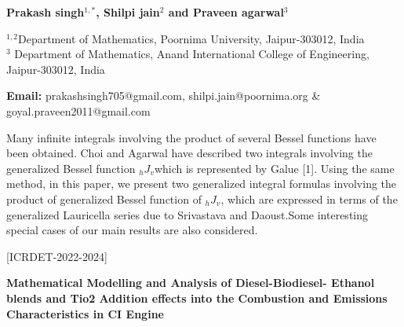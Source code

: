 \documentclass[twoside,11pt]{amsart}
\begin{document}
\centerline{\textbf{Prakash singh$^{1,*}$,  Shilpi jain$^{2}$ and Praveen agarwal$^{3}$   }}
\vskip 5mm
\begin{flushleft}
$^{1,2}$Department of Mathematics, Poornima University, Jaipur-303012, India\\
$^{3}$ Department of Mathematics, Anand International College of Engineering,
Jaipur-303012, India
\vskip 5mm
\end{flushleft}
\vskip 2mm
\begin{flushleft}
{\bf Email:}  prakashsingh705@gmail.com, shilpi.jain@poornima.org \&   goyal.praveen2011@gmail.com
\end{flushleft}
\vskip 5mm
Many infinite integrals involving the product of several Bessel functions
have been obtained. Choi and Agarwal have described two integrals involving the generalized Bessel function ${}_hJ_v$which is represented by Galue [1]. Using the same method,
in this paper, we present two generalized integral formulas involving the product of
generalized Bessel function of  ${}_hJ_v$, which are expressed in terms of the generalized
Lauricella series due to Srivastava and Daoust.Some interesting special cases of our
main results are also considered.
\newpage















\vskip 5mm
\begin{flushleft}
\centerline{[ICRDET-2022-2024]}
\end{flushleft}
\begin{center}\bf\LARGE
Mathematical Modelling and Analysis of Diesel-Biodiesel-
Ethanol blends and Tio2 Addition effects into the Combustion
and Emissions Characteristics in CI Engine
\end{center}
\vskip 3mm
\end{document}
